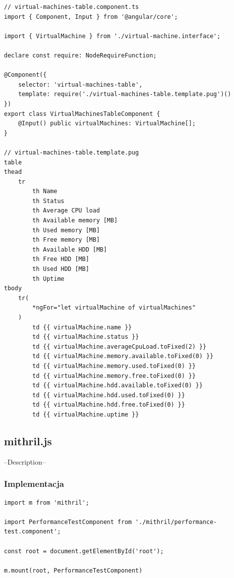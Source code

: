 \documentclass[polish, twoside, 12pt]{mwart}
\begin{document}
\begin{lstlisting}[caption=Komponent tabeli]
// virtual-machines-table.component.ts
import { Component, Input } from '@angular/core';

import { VirtualMachine } from './virtual-machine.interface';

declare const require: NodeRequireFunction;

@Component({
    selector: 'virtual-machines-table',
    template: require('./virtual-machines-table.template.pug')()
})
export class VirtualMachinesTableComponent {
    @Input() public virtualMachines: VirtualMachine[];
}

// virtual-machines-table.template.pug
table
thead
    tr
        th Name
        th Status
        th Average CPU load
        th Available memory [MB]
        th Used memory [MB]
        th Free memory [MB]
        th Available HDD [MB]
        th Free HDD [MB]
        th Used HDD [MB]
        th Uptime
tbody
    tr(
        *ngFor="let virtualMachine of virtualMachines"
    )
        td {{ virtualMachine.name }}
        td {{ virtualMachine.status }}
        td {{ virtualMachine.averageCpuLoad.toFixed(2) }}
        td {{ virtualMachine.memory.available.toFixed(0) }}
        td {{ virtualMachine.memory.used.toFixed(0) }}
        td {{ virtualMachine.memory.free.toFixed(0) }}
        td {{ virtualMachine.hdd.available.toFixed(0) }}
        td {{ virtualMachine.hdd.used.toFixed(0) }}
        td {{ virtualMachine.hdd.free.toFixed(0) }}
        td {{ virtualMachine.uptime }}
\end{lstlisting}

\subsection{mithril.js}

--Description--

\subsubsection{Implementacja}

\begin{lstlisting}[caption=Inicjalizacja głównego komponentu]
import m from 'mithril';

import PerformanceTestComponent from './mithril/performance-test.component';

const root = document.getElementById('root');

m.mount(root, PerformanceTestComponent)
\end{lstlisting}
\end{document}
